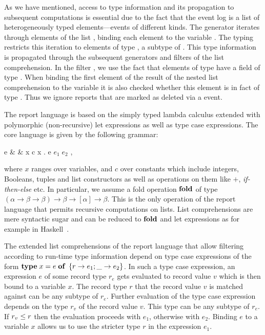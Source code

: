 As we have mentioned, access to type information and its propagation
to subsequent computations is essential due to the fact that the event
log is a list of heterogeneously typed elements---events of different
kinds. The generator  iterates
through elements of the list , binding each element to the
variable . The typing  restricts this
iteration to elements of type , a subtype of
. This type information is propagated through the
subsequent generators and filters of the list comprehension. In the
filter , we use the fact that elements of type
 have a field  of type
. When binding the first element of the result of the
nested list comprehension to the variable  it is also checked
whether this element is in fact of type . Thus we
ignore reports that are marked as deleted via a 
event.


The report language is based on the simply typed lambda calculus
extended with polymorphic (non-recursive) let expressions as well as
type case expressions. The core language is given by the following
grammar:
\begin{center}
  \begin{bnf}
    e & \ebnf & x \bnfsep c \bnfsep \lambda x . e \bnfsep \mbox{$e_1
      \; e_2$} \bnfsep {}
    \bnfsep {},
  \end{bnf}
\end{center}
where $x$ ranges over variables, and $c$ over constants which include
integers, Booleans, tuples and list constructors as well as operations
on them like $+$, \emph{if-then-else} etc. In particular, we assume a
fold operation $\mathbf{fold}$ of type $(\alpha \to \beta \to \beta) \to
\beta \to [\alpha] \to \beta$. This is the only operation of the
report language that permits recursive computations on lists. List
comprehensions are mere syntactic sugar and can be reduced to $\mathbf{fold}$
and let expressions as for example in Haskell~\cite{marlow10haskell}.

The extended list comprehensions of the report language that allow
filtering according to run-time type information depend on type case
expressions of the form $\mathbf{type}\;x = e\;\mathbf{of}\;\left\{r \to e_1 ;
  \_ \to e_2\right\}$. In such a type case expression, an expression
$e$ of some record type $r_e$ gets evaluated to record value $v$ which
is then bound to a variable $x$. The record type $r$ that the record
value $v$ is matched against can be any subtype of $r_e$. Further
evaluation of the type case expression depends on the type $r_v$ of
the record value $v$. This type can be any subtype of $r_e$. If $r_v
\le r$ then the evaluation proceeds with $e_1$, otherwise with
$e_2$. Binding $e$ to a variable $x$ allows us to use the stricter
type $r$ in the expression $e_1$.

